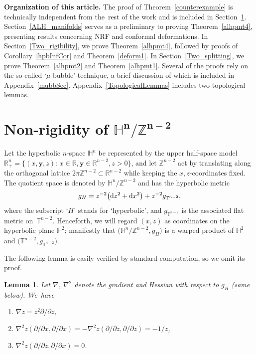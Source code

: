 \documentclass[10pt,a4paper]{amsart}
\numberwithin{equation}{section}
\newtheorem{Lemma}[Theorem]{Lemma}
\def\R{\mathbb{R}}
\def\H{\mathbb{H}}
\def\T{\mathbb{T}}
\def\Z{\mathbb{Z}}
\def\ed{{\rm d}}
\begin{document}
\textbf{Organization of this article.}
The proof of Theorem~\ref{counterexample} is technically independent from
the~rest of the work and is included in Section~\ref{Non-rigidity}. Section~\ref{ALH_manifolds} serves as a preliminary to proving
Theorem~\ref{alhpmt4}, presenting results concerning NRF and conformal deformations.
In Section~\ref{Two_rigibility}, we prove Theorem~\ref{alhpmt4}, followed by
proofs of Corollary~\ref{hpbInfCor} and Theorem~\ref{deform1}.
In Section~\ref{Two_splitting}, we prove Theorem~\ref{alhpmt2} and Theorem~\ref{alhpmt1}.
Several of the proofs rely on the so-called `$\mu$-bubble' technique,
a brief discussion of which is included in Appendix~\ref{mubbSec}. Appendix~\ref{TopologicalLemmas} includes
two topological lemmas.


\section[Non-rigidity of H\^{}n/Z\^{}(n-2)]{Non-rigidity of $\boldsymbol{\H^n/\Z^{n-2}}$}\label{Non-rigidity}

Let the hyperbolic $n$-space $\H^n$ be represented by the upper half-space model
$\R^n_+ = \{(x,\boldsymbol{y},z)$: $x\in \R, \boldsymbol{y}\in \R^{n-2}, z>0\}$,
and let $\Z^{n-2}$ act by translating along the orthogonal lattice $2\pi \Z^{n-2}\subset \R^{n-2}$
while keeping the $x,z$-coordinates fixed. The quotient space is denoted by
$\H^{n}/\Z^{n-2}$ and has the hyperbolic metric
\begin{equation}\label{gHdef}
	g_{H} = z^{-2}\bigl(\ed z^2 + \ed x^2\bigr) + z^{-2} g_{\T^{n-2}},
\end{equation}
where the subscript `$H$' stands for `hyperbolic', and $g_{\T^{n-2}}$ is the associated flat metric on~$\T^{n-2}$.
Henceforth, we will regard $(x,z)$ as coordinates on the hyperbolic plane $\H^2$;
manifestly that $\big(\H^{n}/\Z^{n-2},g_H\big)$ is a warped product of $\H^2$ and $\big(\T^{n-2}, g_{\T^{n-2}}\big)$.

The following lemma is easily verified by standard computation, so we omit its proof.
\begin{Lemma}\label{H2DerHess}
Let $\nabla$, $\nabla^2$ denote the gradient and Hessian
with respect to $g_H$ (same below). We~have
\begin{enumerate}\itemsep=0pt
    \item[$(a)$] $\nabla z=z^2{\partial}/{\partial z}$,
	\item[$(b)$] $\nabla^2z({\partial}/{\partial x}, {\partial}/{\partial x}) = -\nabla^2z({\partial}/{\partial z}, {\partial}/{\partial z})=-1/z$,
    \item[$(c)$] $\nabla^2z({\partial}/{\partial z}, {\partial}/{\partial x})=0$.
\end{enumerate}	
\end{Lemma}
\end{document}

